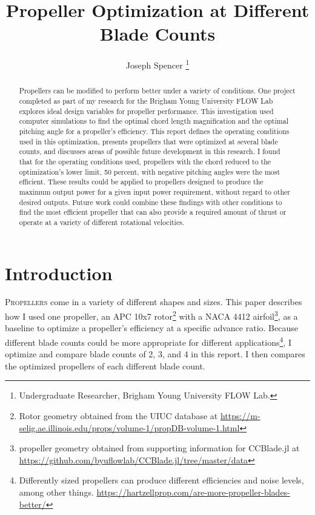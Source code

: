 \documentclass[journal ]{new-aiaa}
\title{Propeller Optimization at Different Blade Counts}
\author{Joseph Spencer \footnote{Undergraduate Researcher, Brigham Young University FLOW Lab.}}
\affil{Brigham Young University, Provo, Utah, 84601}
\begin{document}
\maketitle

\begin{abstract}

Propellers can be modified to perform better under a variety of conditions. One project completed as part of my research for the Brigham Young University FLOW Lab explores ideal design variables for propeller performance. This investigation used computer simulations to find the optimal chord length magnification and the optimal pitching angle for a propeller's efficiency. This report defines the operating conditions used in this optimization, presents propellers that were optimized at several blade counts, and discusses areas of possible future development in this research. I found that for the operating conditions used, propellers with the chord reduced to the optimization's lower limit, 50 percent, with negative pitching angles were the most efficient. These results could be applied to propellers designed to produce the maximum output power for a given input power requirement, without regard to other desired outputs. Future work could combine these findings with other conditions to find the most efficient propeller that can also provide a required amount of thrust or operate at a variety of different rotational velocities.

\end{abstract}


\section{Introduction}

\lettrine{P}{ropellers} come in a variety of different shapes and sizes. This paper describes how I used one propeller, an APC 10x7 rotor\footnote{Rotor geometry obtained from the UIUC database at \url{https://m-selig.ae.illinois.edu/props/volume-1/propDB-volume-1.html}} with a NACA 4412 airfoil\footnote{propeller geometry obtained from supporting information for CCBlade.jl at \url{https://github.com/byuflowlab/CCBlade.jl/tree/master/data}}, as a baseline to optimize a propeller's efficiency at a specific advance ratio. Because different blade counts could be more appropriate for different applications\footnote{Differently sized propellers can produce different efficiencies and noise levels, among other things. \url{https://hartzellprop.com/are-more-propeller-blades-better/}}, I optimize and compare blade counts of 2, 3, and 4 in this report. I then compares the optimized propellers of each different blade count.
\end{document}
